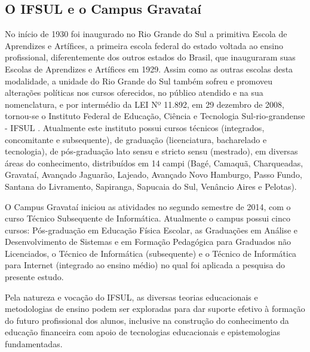 \subsection{O IFSUL e o Campus Gravataí}
No início de 1930 foi inaugurado no Rio Grande do Sul a primitiva Escola de Aprendizes e Artífices, a primeira escola federal do estado voltada ao ensino profissional, diferentemente dos outros estados do Brasil, que inauguraram suas Escolas de Aprendizes e Artífices em 1929. Assim como as outras escolas desta modalidade, a unidade do Rio Grande do Sul também sofreu e promoveu alterações políticas nos cursos oferecidos, no público atendido e na sua nomenclatura, e por intermédio da LEI Nº 11.892, em 29 dezembro de 2008, tornou-se o Instituto Federal de Educação, Ciência e Tecnologia Sul-rio-grandense - IFSUL \cite{ifsul2015}. Atualmente este instituto possui cursos técnicos (integrados, concomitante e subsequente), de graduação (licenciatura, bacharelado e tecnologia), de pós-graduação lato sensu e stricto sensu (mestrado), em diversas áreas do conhecimento, distribuídos em 14 campi (Bagé, Camaquã, Charqueadas, Gravataí, Avançado Jaguarão, Lajeado, Avançado Novo Hamburgo, Passo Fundo, Santana do Livramento, Sapiranga, Sapucaia do Sul, Venâncio Aires e Pelotas).

O Campus Gravataí iniciou as atividades no segundo semestre de 2014, com o curso Técnico Subsequente de Informática. Atualmente o campus possui cinco cursos: Pós-graduação em Educação Física Escolar, as Graduações em Análise e Desenvolvimento de Sistemas e em Formação Pedagógica para Graduados não Licenciados, o Técnico de Informática (subsequente) e o Técnico de Informática para Internet (integrado ao ensino médio) no qual foi aplicada a pesquisa do presente estudo.

Pela natureza e vocação do IFSUL, as diversas teorias educacionais e metodologias de ensino podem ser exploradas para dar suporte efetivo à formação do futuro profissional dos alunos, inclusive na construção do conhecimento da educação financeira com apoio de tecnologias educacionais e epistemologias fundamentadas.

